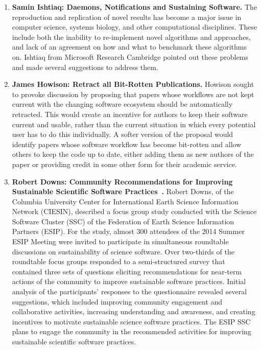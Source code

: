 \documentclass[11pt, oneside]{amsart}
\begin{document}
\begin{enumerate}
\item \textbf{Samin Ishtiaq: Daemons, Notifications and Sustaining Software. }%
The reproduction and replication of novel results has become a major issue in
computer science, systems biology, and other computational disciplines. These
include both the inability to re-implement novel algorithms and approaches, and
lack of an agreement on how and what to benchmark these algorithms on. Ishtiaq
from Microsoft Research Cambridge pointed out these problems and made several
suggestions to address them.

\item \textbf{James Howison: Retract all Bit-Rotten Publications. }%
Howison sought to provoke discussion by proposing that papers whose workflows
are not kept current with the changing software ecosystem should be
automatically retracted. This would create an incentive for authors to keep
their software current and usable, rather than the current situation in which
every potential user has to do this individually. A softer version of the
proposal would identify papers whose software workflow has become bit-rotten and
allow others to keep the code up to date, either adding them as new authors of
the paper or providing credit in some other form for their academic service.




\item \textbf{Robert Downs: Community Recommendations for Improving Sustainable
Scientific Software Practices~\cite{Downs_poster}.} Robert Downs, of the Columbia
University Center for International Earth Science Information Network (CIESIN),
described a focus group study conducted with the Science Software Cluster (SSC)
of the Federation of Earth Science Information Partners (ESIP). For the study,
almost 300 attendees of the 2014 Summer ESIP Meeting were invited to participate
in simultaneous roundtable discussions on sustainability of science software.
Over two-thirds of the roundtable focus groups responded to a semi-structured
survey that contained three sets of questions eliciting recommendations for
near-term actions of the community to improve sustainable software practices.
Initial analysis of the participants' responses to the questionnaire revealed
several suggestions, which included improving community engagement and
collaborative activities, increasing understanding and awareness, and creating
incentives to motivate sustainable science software practices. The ESIP SSC
plans to engage the community in the recommended activities for improving
sustainable scientific software practices.


\end{enumerate}
\end{document}
